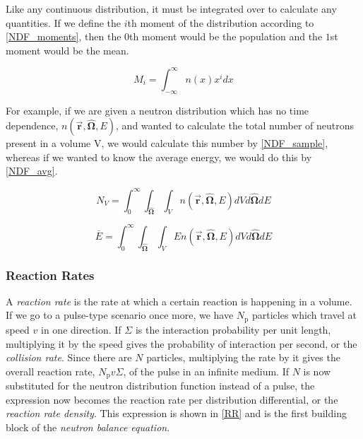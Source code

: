 Like any continuous distribution, it must be integrated over to calculate any quantities.  If we define the $i$th moment of the distribution according to \eqref{NDF_moments}, then the $0$th moment would be the population and the $1$st moment would be the mean.

\begin{equation}
\label{NDF_moments}
M_i = \int_{-\infty}^{\infty} n(x)  x^{i} dx
\end{equation}

For example, if we are given a neutron distribution which has no time dependence, $n(\boldsymbol{\vec{r}},\boldsymbol{\hat{\Omega}},E)$, and wanted to calculate the total number of neutrons present in a volume V, we would calculate this number by \eqref{NDF_sample}, whereas if we wanted to know the average energy, we would do this by \eqref{NDF_avg}.

\begin{equation}
\label{NDF_sample}
N_V = \int_0^\infty \int_{\boldsymbol{\hat{\Omega}}} \int_{V} n(\boldsymbol{\vec{r}},\boldsymbol{\hat{\Omega}},E) dV d\boldsymbol{\hat{\Omega}} dE
\end{equation}

\begin{equation}
\label{NDF_avg}
\bar{E} = \int_0^\infty \int_{\boldsymbol{\hat{\Omega}}} \int_{V} E n(\boldsymbol{\vec{r}},\boldsymbol{\hat{\Omega}},E) dV d\boldsymbol{\hat{\Omega}} dE
\end{equation}

\subsubsection{Reaction Rates}

A \emph{reaction rate} is the rate at which a certain reaction is happening in a volume.  If we go to a pulse-type scenario once more, we have $N_\mathrm{p}$ particles which travel at speed $v$ in one direction.  If $\Sigma$ is the interaction probability per unit length, multiplying it by the speed gives the probability of interaction per second, or the \emph{collision rate}.  Since there are $N$ particles, multiplying the rate by it gives the overall reaction rate, $N_\mathrm{p} v \Sigma$, of the pulse in an infinite medium.  If $N$ is now substituted for the neutron distribution function instead of a pulse, the expression now becomes the reaction rate per distribution differential, or the \emph{reaction rate density}.  This expression is shown in \eqref{RR} and is the first building block of the \emph{neutron balance equation}.

